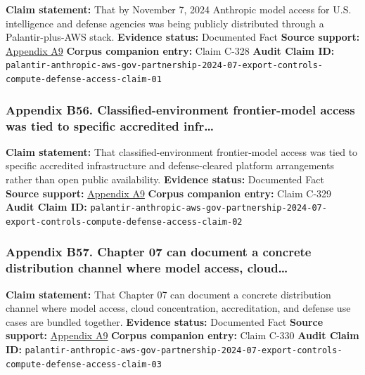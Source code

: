 \documentclass[
  american,
  11pt,
  letterpaper,
]{article}
\begin{document}
\textbf{Claim statement:} That by November 7, 2024 Anthropic model
access for U.S. intelligence and defense agencies was being publicly
distributed through a Palantir-plus-AWS stack. \textbf{Evidence status:}
Documented Fact \textbf{Source support:}
\hyperref[appendix-a9-anthropic-and-palantir-partner-to-bring-claude-ai-models-to-aws-for-u-s-government-intelligence-and-defense-operations]{Appendix
A9} \textbf{Corpus companion entry:} Claim C-328 \textbf{Audit Claim
ID:}
\texttt{palantir-anthropic-aws-gov-partnership-2024-07-export-controls-compute-defense-access-claim-01}

\subsubsection{Appendix B56. Classified-environment frontier-model
access was tied to specific accredited
infr\ldots{}}\label{appendix-b56-classified-environment-frontier-model-access-was-tied-to-specific-accredited-infr}

\textbf{Claim statement:} That classified-environment frontier-model
access was tied to specific accredited infrastructure and
defense-cleared platform arrangements rather than open public
availability. \textbf{Evidence status:} Documented Fact \textbf{Source
support:}
\hyperref[appendix-a9-anthropic-and-palantir-partner-to-bring-claude-ai-models-to-aws-for-u-s-government-intelligence-and-defense-operations]{Appendix
A9} \textbf{Corpus companion entry:} Claim C-329 \textbf{Audit Claim
ID:}
\texttt{palantir-anthropic-aws-gov-partnership-2024-07-export-controls-compute-defense-access-claim-02}

\subsubsection{Appendix B57. Chapter 07 can document a concrete
distribution channel where model access,
cloud\ldots{}}\label{appendix-b57-chapter-07-can-document-a-concrete-distribution-channel-where-model-access-cloud}

\textbf{Claim statement:} That Chapter 07 can document a concrete
distribution channel where model access, cloud concentration,
accreditation, and defense use cases are bundled together.
\textbf{Evidence status:} Documented Fact \textbf{Source support:}
\hyperref[appendix-a9-anthropic-and-palantir-partner-to-bring-claude-ai-models-to-aws-for-u-s-government-intelligence-and-defense-operations]{Appendix
A9} \textbf{Corpus companion entry:} Claim C-330 \textbf{Audit Claim
ID:}
\texttt{palantir-anthropic-aws-gov-partnership-2024-07-export-controls-compute-defense-access-claim-03}
\end{document}
